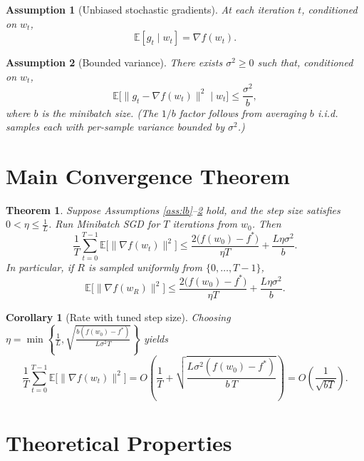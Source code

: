 \documentclass{article}
\newtheorem{theorem}{Theorem}
\newtheorem{assumption}{Assumption}
\newtheorem{corollary}{Corollary}
\begin{document}
\begin{assumption}[Unbiased stochastic gradients]\label{ass:unbiased}
At each iteration $t$, conditioned on $w_t$,
\[
\mathbb{E}[g_t \mid w_t] = \nabla f(w_t).
\]
\end{assumption}

\begin{assumption}[Bounded variance]\label{ass:var}
There exists $\sigma^2 \geq 0$ such that, conditioned on $w_t$,
\[
\mathbb{E}\big[\|g_t - \nabla f(w_t)\|^2 \mid w_t\big] \leq \frac{\sigma^2}{b},
\]
where $b$ is the minibatch size. (The $1/b$ factor follows from averaging $b$ i.i.d. samples each with per-sample variance bounded by $\sigma^2$.)
\end{assumption}

\section*{Main Convergence Theorem}

\begin{theorem}\label{thm:main}
Suppose Assumptions \ref{ass:lb}--\ref{ass:var} hold, and the step size satisfies $0 < \eta \leq \frac{1}{L}$. Run Minibatch SGD for $T$ iterations from $w_0$. Then
\[
\frac{1}{T}\sum_{t=0}^{T-1} \mathbb{E}\big[\|\nabla f(w_t)\|^2\big]
\leq \frac{2\big(f(w_0) - f^*\big)}{\eta T} + \frac{L \eta \sigma^2}{b}.
\]
In particular, if $R$ is sampled uniformly from $\{0,\dots,T-1\}$,
\[
\mathbb{E}\big[\|\nabla f(w_R)\|^2\big]
\leq \frac{2\big(f(w_0) - f^*\big)}{\eta T} + \frac{L \eta \sigma^2}{b}.
\]
\end{theorem}

\begin{corollary}[Rate with tuned step size]\label{cor:rate}
Choosing $\eta = \min\left\{ \frac{1}{L}, \sqrt{\frac{b(f(w_0)-f^*)}{L\sigma^2 T}} \right\}$ yields
\[
\frac{1}{T}\sum_{t=0}^{T-1} \mathbb{E}\big[\|\nabla f(w_t)\|^2\big]
= O\!\left( \frac{1}{T} + \sqrt{\frac{L\sigma^2 (f(w_0)-f^*)}{b\,T}} \right)
= O\!\left( \frac{1}{\sqrt{bT}} \right).
\]
\end{corollary}

\section*{Theoretical Properties}
\end{document}
